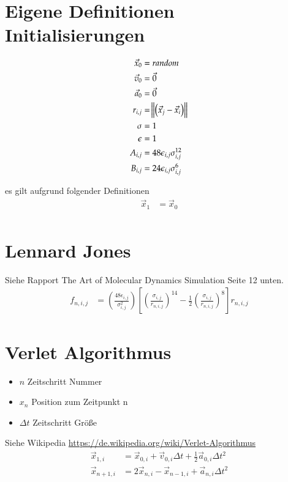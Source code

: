 \documentclass{article}
\begin{document}
\section*{Eigene Definitionen Initialisierungen}
\begin{align}
\vec{x}_0&=random\\
	\vec{v}_0&=\vec{0}\\
	\vec{a}_0&=\vec{0}\\
	r_{i,j}&=\norm{\left(\vec{x}_{j}-\vec{x}_{i}\right)}\\
	\sigma&=1\\
	\epsilon&=1\\
	A_{i,j}&=48\epsilon_{i,j}\sigma_{i,j}^{12}\\
	B_{i,j}&=24\epsilon_{i,j}\sigma_{i,j}^{6}\\
\end{align}

es gilt aufgrund folgender Definitionen
\begin{align}
	\vec{x}_1&=\vec{x}_0\\
\end{align}


\section*{Lennard Jones}
Siehe Rapport The Art of Molecular Dynamics Simulation Seite 12 unten.\\
\begin{align*}
	f_{n,i,j}&=\left(\frac{48\epsilon_{i,j}}{\sigma_{i,j}^2}\right)\left[\left(\frac{\sigma_{i,j}}{r_{n,i,j}}\right)^{14}-\frac{1}{2}\left(\frac{\sigma_{i,j}}{r_{n,i,j}}\right)^8\right]r_{n,i,j}
\end{align*}
\section*{Verlet Algorithmus}
\begin{itemize}
	\item $n$ Zeitschritt Nummer
	\item $x_{n}$ Position zum Zeitpunkt n
	\item $\Delta t$ Zeitschritt Größe
\end{itemize}
Siehe Wikipedia \url{https://de.wikipedia.org/wiki/Verlet-Algorithmus}\\
\begin{align*}
	\vec{x}_{1,i}&=\vec{x}_{0,i}+\vec{v}_{0,i}\Delta t+\frac{1}{2}\vec{a}_{0,i}\Delta t^2\\
	\vec{x}_{n+1,i}&=2\vec{x}_{n,i}-\vec{x}_{n-1,i}+\vec{a}_{n,i}\Delta t^2
\end{align*}
\end{document}
